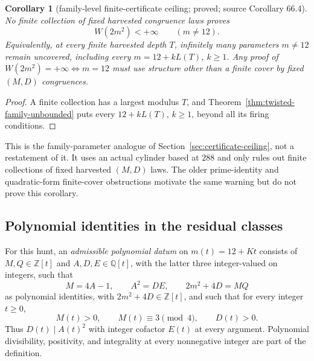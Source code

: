 \documentclass[10pt,reqno]{amsart}
\newtheorem{corollary}[theorem]{Corollary}
\theoremstyle{definition}
\newcommand{\1}{\mathbf 1}
\begin{document}
\begin{corollary}[family-level finite-certificate ceiling; proved; source Corollary 66.4]
\label{cor:family-certificate-ceiling}
No finite collection of fixed harvested congruence laws proves
\begin{equation}\tag{66.9}
                         W(2m^2)<+\infty\qquad(m\ne12).
\end{equation}
Equivalently, at every finite harvested depth $T$, infinitely many parameters
$m\ne12$ remain uncovered, including every
$m=12+kL(T)$, $k\geq1$.  Any proof of
$W(2m^2)=+\infty\Longleftrightarrow m=12$ must use structure other than a
finite cover by fixed $(M,D)$ congruences.
\end{corollary}
\begin{proof}
A finite collection has a largest modulus $T$, and
Theorem~\ref{thm:twisted-family-unbounded} puts every
$12+kL(T)$, $k\geq1$, beyond all its firing conditions.
\end{proof}
This is the family-parameter analogue of Section~\ref{sec:certificate-ceiling},
not a restatement of it.  It uses an actual cylinder based at $288$ and only
rules out finite collections of fixed harvested $(M,D)$ laws.  The older
prime-identity and quadratic-form finite-cover obstructions motivate the
same warning but do not prove this corollary.

\subsection{Polynomial identities in the residual classes}
For this hunt, an \emph{admissible polynomial datum} on $m(t)=12+Kt$
consists of $M,Q\in\mathbb Z[t]$ and $A,D,E\in\mathbb Q[t]$, with the latter
three integer-valued on integers, such that
\begin{equation}\tag{66.10}
 M=4A-1,\qquad A^2=DE,\qquad 2m^2+4D=MQ
\end{equation}
as polynomial identities, with $2m^2+4D\in\mathbb Z[t]$, and such that for
every integer $t\geq0$,
\begin{equation}\tag{66.11}
                 M(t)>0,\qquad M(t)\equiv3\pmod4,\qquad D(t)>0.
\end{equation}
Thus $D(t)\mid A(t)^2$ with integer cofactor $E(t)$ at every argument.
Polynomial divisibility, positivity, and integrality at every nonnegative
integer are part of the definition.
\end{document}

